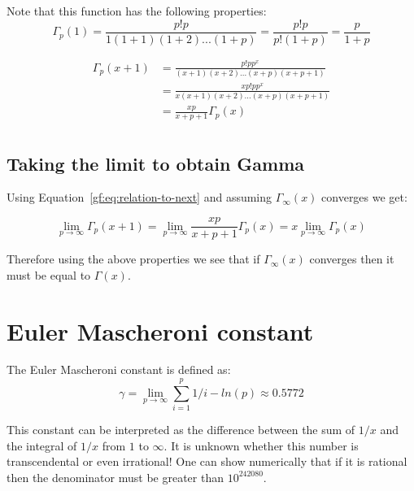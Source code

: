 \documentclass[a4paper]{article}
\begin{document}
    Note that this function has the following properties:
    \begin{equation}
        \Gamma_{p}(1) = \frac{p! p}{1 (1 + 1)(1+2)...(1+p)} = \frac{p! p}{p! (1+p)} = \frac{p}{1+p}\label{gf:eq:equation5}
    \end{equation}

    \begin{equation}
        \label{gf:eq:relation-to-next}
        \begin{split}
            \Gamma_{p}(x+1) &= \frac{p! p p^x}{(x + 1)(x+2)...(x+p)(x+p+1)} \\
            &= \frac{x p! p p^x}{x(x + 1)(x+2)...(x+p)(x+p+1)} \\
            &= \frac{x p}{x+p+1} \Gamma_{p}(x) \\
        \end{split}
    \end{equation}

    \subsection{Taking the limit to obtain Gamma}\label{gf:subsec:taking-the-limit-to-obtain-gamma}

    Using Equation~\ref{gf:eq:relation-to-next} and assuming $\Gamma_{\infty}(x)$ converges we get:

    \begin{equation}
        \lim_{p \to \infty} \Gamma_{p}(x+1) =
        \lim_{p \to \infty} \frac{x p}{x+p+1} \Gamma_{p}(x) = x \lim_{p \to \infty} \Gamma_{p}(x)\label{gf:eq:equation6}
    \end{equation}

    Therefore using the above properties we see that if $\Gamma_{\infty}(x)$ converges then it must be equal to $\Gamma(x)$.


    \section{Euler Mascheroni constant}\label{gf:sec:euler-const}
    The Euler Mascheroni constant is defined as:
    \begin{equation}
        \label{gf:eq:euler_mascheroni_def}
        \gamma = \lim_{p \to \infty} \sum_{i=1}^{p} 1/i - ln(p) \approx 0.5772
    \end{equation}

    This constant can be interpreted as the difference between the sum of $1/x$ and the integral of $1/x$ from $1$ to $\infty$.
    It is unknown whether this number is transcendental or even irrational!
    One can show numerically that if it is rational then the denominator must be greater than $10^{242080}$.
\end{document}
